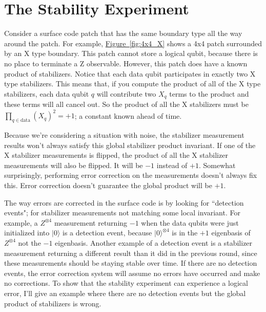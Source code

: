 \documentclass[onecolumn,unpublished,a4paper]{quantumarticle}
\theoremstyle{definition}
\theoremstyle{definition}
\theoremstyle{definition}
\newcommand{\fig}[1]{\hyperref[fig:#1]{Figure~\ref*{fig:#1}}}
\begin{document}
\section{The Stability Experiment}

Consider a surface code patch that has the same boundary type all the way around the patch.
For example, \fig{4x4_X} shows a 4x4 patch surrounded by an X type boundary.
This patch cannot store a logical qubit, because there is no place to terminate a Z observable.
However, this patch does have a known product of stabilizers.
Notice that each data qubit participates in exactly two X type stabilizers.
This means that, if you compute the product of all of the X type stabilizers, each data qubit $q$ will contribute two $X_q$ terms to the product and these terms will all cancel out.
So the product of all the X stabilizers must be $\prod_{q \in \text{data}} (X_q)^2 = +1$; a constant known ahead of time.

Because we're considering a situation with noise, the stabilizer measurement results won't always satisfy this global stabilizer product invariant.
If one of the X stabilizer measurements is flipped, the product of all the X stabilizer measurements will also be flipped.
It will be $-1$ instead of $+1$.
Somewhat surprisingly, performing error correction on the measurements doesn't always fix this.
Error correction doesn't guarantee the global product will be $+1$.

The way errors are corrected in the surface code is by looking for ``detection events"; for stabilizer measurements not matching some local invariant.
For example, a $Z^{\otimes 4}$ measurement returning $-1$ when the data qubits were just initialized into $|0\rangle$ is a detection event, because $|0\rangle^{\otimes 4}$ is in the $+1$ eigenbasis of $Z^{\otimes 4}$ not the $-1$ eigenbasis.
Another example of a detection event is a stabilizer measurement returning a different result than it did in the previous round, since these measurements should be staying stable over time.
If there are no detection events, the error correction system will assume no errors have occurred and make no corrections.
To show that the stability experiment can experience a logical error, I'll give an example where there are no detection events but the global product of stabilizers is wrong.
\end{document}

